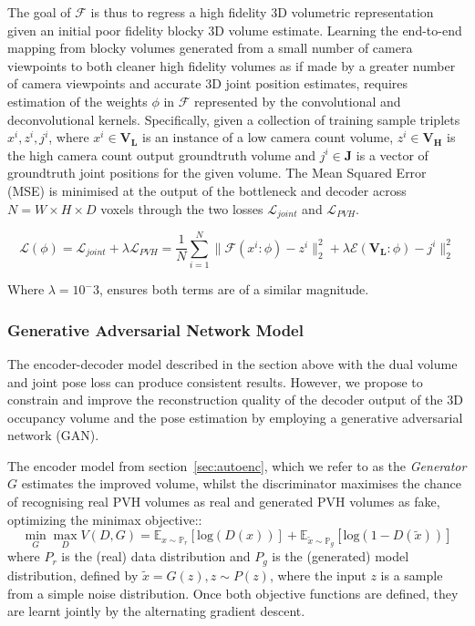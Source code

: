\documentclass{bmvc2k}
\newcommand{\squeezeup}{\vspace{-2mm}}
\begin{document}
The goal of $\mathcal{F}$ is thus to regress a high fidelity 3D volumetric representation given an initial poor fidelity blocky  3D volume estimate. Learning the end-to-end mapping from blocky volumes generated from a small number of camera viewpoints to both cleaner high fidelity volumes as if made by a greater number of camera viewpoints and accurate 3D joint position estimates, requires estimation of the weights $\phi$ in $\mathcal{F}$ represented by the convolutional and deconvolutional kernels. Specifically, given a collection of training sample triplets ${x^i, z^i, j^i}$, where $x^i \in \mathbf{V_L}$ is an instance of a low camera count volume, $z^i \in \mathbf{V_H}$ is the high camera count output groundtruth volume and $j^i \in \mathbf{J}$ is a vector of groundtruth joint positions for the given volume. The Mean Squared Error (MSE) is minimised at the output of the bottleneck and decoder across $N=W \times H \times D$ voxels through the two losses $\mathcal{L}_{joint}$ and $\mathcal{L}_{PVH}$.


\begin{equation}
\mathcal{L(\phi)} = \mathcal{L}_{joint} + \lambda \mathcal{L}_{PVH} = \frac{1}{N}\sum^N_{i=1} \| \mathcal{F}(x^i: \phi) -z^i \|^2_2 +\lambda \mathcal{E}({\mathbf{V_L}}: \phi) -j^i \|^2_2 
\label{eq:DualLoss}
\end{equation}

Where $\lambda = 10^-3$, ensures both terms are of a similar magnitude.
\squeezeup
\squeezeup

\subsubsection{Generative Adversarial Network Model}
\label{sec:GAN}
The encoder-decoder model described in the section above with the dual volume and joint pose loss can produce consistent results. However, we propose to constrain and improve the reconstruction quality of the decoder output of the 3D occupancy volume and the pose estimation by employing a generative adversarial network (GAN).

The encoder model from section~\ref{sec:autoenc}, which we refer to as the \emph{Generator} $G$ estimates the improved volume, whilst the discriminator  maximises the chance of recognising real PVH volumes as real and generated PVH volumes as fake, optimizing the minimax objective::
\begin{equation}
\min_G \max_D V(D,G) = \mathbb{E}_{x \sim \mathbb{P}_r}[\text{log}(D(x))] +  \mathbb{E}_{\widetilde{x} \sim \mathbb{P}_g}[\text{log}(1 -D(\widetilde{x}))]
\end{equation}
where $P_r$ is the (real) data distribution and $P_g$ is the (generated) model distribution, defined by $\widetilde{x} = G(z), z \sim P(z)$, where the input $z$ is a sample from a simple noise distribution. Once both objective functions are defined, they are learnt jointly by the alternating gradient descent. 
\end{document}
